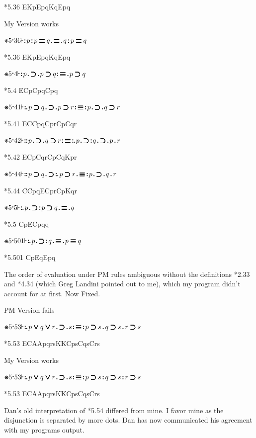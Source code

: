 \documentclass[12pt]{article}
\newcommand{\pmthm}{\mathpunct{\text{\scalebox{.5}[1]{$\boldsymbol\vdash$}}}} %
\newcommand{\pmast}{\text{\resizebox{!}{.75\height}{\ding{107}}}} %
\newcommand{\pmcdot}{\text{\raisebox{.05cm}{$\boldsymbol\cdot$}}} %
\newcommand{\pmd}{\hbox{\rule{.3ex}{.3ex}}} %
\newcommand{\pmdd}{\overset{\pmd}{\pmd}} %
\newcommand{\pmdot}{\mathinner{\pmd}}
\newcommand{\pmdott}{\mathinner{\pmdd}}
\newcommand{\pmdottt}{\mathinner{\pmdd\hspace{1pt}\pmd}}
\newcommand{\pmdotttt}{\mathinner{\pmdd\hspace{1pt}\pmdd}}
\newcommand{\pmor}{\mathbin{\ooalign{$\boldsymbol{\vee}\mkern.5mu$\hidewidth\cr$\boldsymbol{\vee}$\cr\hidewidth$\mkern.5mu\boldsymbol{\vee}$}}}
\newcommand{\pmimp}{\mathbin{\ooalign{$\boldsymbol{\supset}\mkern.5mu$\hidewidth\cr$\boldsymbol{\supset}$\cr\hidewidth$\mkern.5mu\boldsymbol{\supset}$}}} %
\newcommand{\pmand}{\mathbin{\pmd}}%
\newcommand{\pmandd}{\mathbin{\pmdd}}
\newcommand{\pmiff}{\mathbin{\ooalign{$\boldsymbol{\equiv}\mkern.5mu$\hidewidth\cr$\boldsymbol{\equiv}$\cr\hidewidth$\mkern.5mu\boldsymbol{\equiv}$}}} %
\begin{document}
*5.36 EKpEpqKqEpq

My Version works

$\pmast 5 \pmcdot 36 \pmthm \pmdott p \pmandd p \pmiff q \pmdot \pmiff \pmdot q \pmandd p \pmiff q  $

*5.36 EKpEpqKqEpq

$\pmast 5 \pmcdot 4 \pmthm \pmdott p \pmdot \pmimp \pmdot p \pmimp q \pmdott \pmiff \pmdot p \pmimp q    $

*5.4 ECpCpqCpq

$\pmast 5 \pmcdot 41 \pmthm \pmdottt p \pmimp q \pmdot \pmimp \pmdot p \pmimp r \pmdott \pmiff \pmdott p \pmdot \pmimp \pmdot q \pmimp r     $

*5.41 ECCpqCprCpCqr

$\pmast 5 \pmcdot 42 \pmthm \pmdotttt p \pmdot \pmimp \pmdot q \pmimp r \pmdott \pmiff \pmdottt p \pmdot \pmimp \pmdott q \pmdot \pmimp \pmdot p \pmand r $

*5.42 ECpCqrCpCqKpr

$\pmast 5 \pmcdot 44 \pmthm \pmdotttt p \pmimp q \pmdot \pmimp \pmdottt p \pmimp r \pmdot \pmiff \pmdott p \pmdot \pmimp \pmdot q \pmand r  $

*5.44 CCpqECprCpKqr

$\pmast 5 \pmcdot 5 \pmthm \pmdottt p \pmdot \pmimp \pmdott p \pmimp q \pmdot \pmiff \pmdot q $

*5.5 CpECpqq

$\pmast 5 \pmcdot 501 \pmthm \pmdottt p \pmdot \pmimp \pmdott q \pmdot \pmiff \pmdot p \pmiff q $

*5.501 CpEqEpq

The order of evaluation under PM rules ambiguous without the definitions
*2.33 and *4.34 (which Greg Landini pointed out to me), which my program didn't account for at first. Now Fixed.

PM Version fails

$\pmast 5 \pmcdot 53 \pmthm \pmdottt p \pmor q \pmor r \pmdot \pmimp \pmdot s \pmdott \pmiff \pmdott p \pmimp s \pmand q \pmimp s \pmand r \pmimp s $

*5.53 ECAApqrsKKCpsCqsCrs

My Version works

$\pmast 5 \pmcdot 53 \pmthm \pmdottt p \pmor q \pmor r \pmdot \pmimp \pmdot s \pmdott \pmiff \pmdott p \pmimp s \pmandd q \pmimp s \pmandd r \pmimp s $

*5.53 ECAApqrsKKCpsCqsCrs

Dan's old interpretation of *5.54 differed from mine. I favor mine as the disjunction is separated by more dots. Dan has now communicated his agreement with my programs output.
\end{document}
